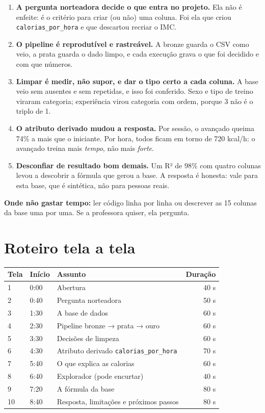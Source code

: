 \documentclass[12pt,a4paper]{article}
\begin{document}
\begin{enumerate}[leftmargin=*, label=\textbf{\arabic*.}]
  \item \textbf{A pergunta norteadora decide o que entra no projeto.} Ela não é enfeite: é o critério para criar (ou não) uma coluna. Foi ela que criou \texttt{calorias\_por\_hora} e que descartou recriar o IMC.
  \item \textbf{O pipeline é reprodutível e rastreável.} A bronze guarda o CSV como veio, a prata guarda o dado limpo, e cada execução grava o que foi decidido e com que números.
  \item \textbf{Limpar é medir, não supor, e dar o tipo certo a cada coluna.} A base veio sem ausentes e sem repetidas, e isso foi conferido. Sexo e tipo de treino viraram categoria; experiência virou categoria com ordem, porque 3 não é o triplo de 1.
  \item \textbf{O atributo derivado mudou a resposta.} Por sessão, o avançado queima 74\% a mais que o iniciante. Por hora, todos ficam em torno de 720 kcal/h: o avançado treina mais \emph{tempo}, não mais \emph{forte}.
  \item \textbf{Desconfiar de resultado bom demais.} Um R² de 98\% com quatro colunas levou a descobrir a fórmula que gerou a base. A resposta é honesta: vale para esta base, que é sintética, não para pessoas reais.
\end{enumerate}

\textbf{Onde não gastar tempo:} ler código linha por linha ou descrever as 15 colunas da base uma por uma. Se a professora quiser, ela pergunta.

\section{Roteiro tela a tela}

\begin{center}
\small
\begin{tabularx}{\linewidth}{@{}l l X r@{}}
\toprule
\textbf{Tela} & \textbf{Início} & \textbf{Assunto} & \textbf{Duração}\\
\midrule
1 & 0:00 & Abertura & 40 s\\
2 & 0:40 & Pergunta norteadora & 50 s\\
3 & 1:30 & A base de dados & 60 s\\
4 & 2:30 & Pipeline bronze → prata → ouro & 60 s\\
5 & 3:30 & Decisões de limpeza & 60 s\\
6 & 4:30 & Atributo derivado \texttt{calorias\_por\_hora} & 70 s\\
7 & 5:40 & O que explica as calorias & 60 s\\
8 & 6:40 & Explorador (pode encurtar) & 40 s\\
9 & 7:20 & A fórmula da base & 80 s\\
10 & 8:40 & Resposta, limitações e próximos passos & 80 s\\
\bottomrule
\end{tabularx}
\end{center}
\end{document}
